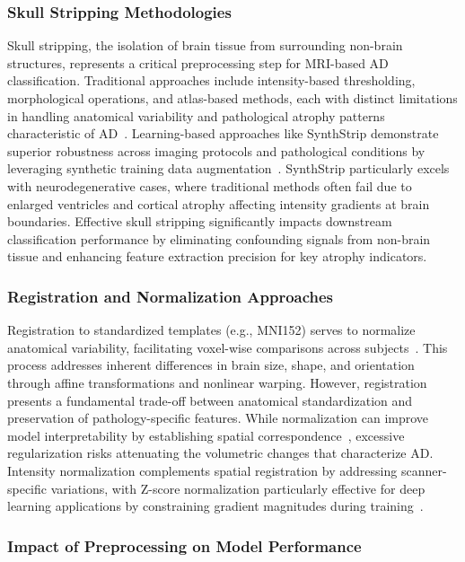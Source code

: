 \documentclass[12pt, a4paper]{article}
\begin{document}
\subsubsection{Skull Stripping Methodologies}

Skull stripping, the isolation of brain tissue from surrounding non-brain structures, represents a critical preprocessing step for MRI-based AD classification. Traditional approaches include intensity-based thresholding, morphological operations, and atlas-based methods, each with distinct limitations in handling anatomical variability and pathological atrophy patterns characteristic of AD~\cite{fatima2020state}. Learning-based approaches like SynthStrip demonstrate superior robustness across imaging protocols and pathological conditions by leveraging synthetic training data augmentation~\cite{hoopes2022synthstrip}. SynthStrip particularly excels with neurodegenerative cases, where traditional methods often fail due to enlarged ventricles and cortical atrophy affecting intensity gradients at brain boundaries. Effective skull stripping significantly impacts downstream classification performance by eliminating confounding signals from non-brain tissue and enhancing feature extraction precision for key atrophy indicators.

\subsubsection{Registration and Normalization Approaches}

Registration to standardized templates (e.g., MNI152) serves to normalize anatomical variability, facilitating voxel-wise comparisons across subjects~\cite{garg2023review}. This process addresses inherent differences in brain size, shape, and orientation through affine transformations and nonlinear warping. However, registration presents a fundamental trade-off between anatomical standardization and preservation of pathology-specific features. While normalization can improve model interpretability by establishing spatial correspondence~\cite{viswan2025enhancing}, excessive regularization risks attenuating the volumetric changes that characterize AD. Intensity normalization complements spatial registration by addressing scanner-specific variations, with Z-score normalization particularly effective for deep learning applications by constraining gradient magnitudes during training~\cite{viswan2025enhancing}.

\subsubsection{Impact of Preprocessing on Model Performance}
\end{document}
